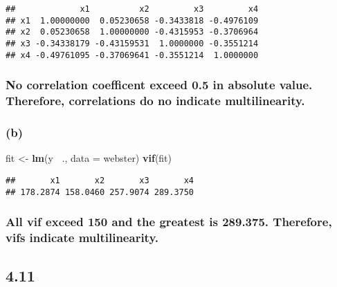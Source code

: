 \documentclass[
]{article}
\newenvironment{Shaded}{\begin{snugshade}}{\end{snugshade}}
\newcommand{\DataTypeTok}[1]{\textcolor[rgb]{0.13,0.29,0.53}{#1}}
\newcommand{\KeywordTok}[1]{\textcolor[rgb]{0.13,0.29,0.53}{\textbf{#1}}}
\newcommand{\NormalTok}[1]{#1}
\newcommand{\OperatorTok}[1]{\textcolor[rgb]{0.81,0.36,0.00}{\textbf{#1}}}
\newcommand{\StringTok}[1]{\textcolor[rgb]{0.31,0.60,0.02}{#1}}
\begin{document}
\begin{verbatim}
##             x1          x2         x3         x4
## x1  1.00000000  0.05230658 -0.3433818 -0.4976109
## x2  0.05230658  1.00000000 -0.4315953 -0.3706964
## x3 -0.34338179 -0.43159531  1.0000000 -0.3551214
## x4 -0.49761095 -0.37069641 -0.3551214  1.0000000
\end{verbatim}

\hypertarget{no-correlation-coefficent-exceed-0.5-in-absolute-value.-therefore-correlations-do-no-indicate-multilinearity.}{%
\subsubsection{No correlation coefficent exceed 0.5 in absolute value.
Therefore, correlations do no indicate
multilinearity.}\label{no-correlation-coefficent-exceed-0.5-in-absolute-value.-therefore-correlations-do-no-indicate-multilinearity.}}

\hypertarget{b}{%
\subsubsection{(b)}\label{b}}

\begin{Shaded}
\begin{Highlighting}[]
\NormalTok{fit <-}\StringTok{ }\KeywordTok{lm}\NormalTok{(y }\OperatorTok{~}\NormalTok{., }\DataTypeTok{data =}\NormalTok{ webster)}
\KeywordTok{vif}\NormalTok{(fit)}
\end{Highlighting}
\end{Shaded}

\begin{verbatim}
##       x1       x2       x3       x4 
## 178.2874 158.0460 257.9074 289.3750
\end{verbatim}

\hypertarget{all-vif-exceed-150-and-the-greatest-is-289.375.-therefore-vifs-indicate-multilinearity.}{%
\subsubsection{All vif exceed 150 and the greatest is 289.375.
Therefore, vifs indicate
multilinearity.}\label{all-vif-exceed-150-and-the-greatest-is-289.375.-therefore-vifs-indicate-multilinearity.}}

\hypertarget{section-1}{%
\subsection{4.11}\label{section-1}}
\end{document}
